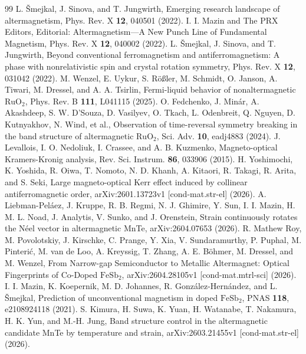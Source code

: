 \documentclass{article}
\begin{document}
\begin{thebibliography}{99}
 L. Šmejkal, J. Sinova, and T. Jungwirth, Emerging research landscape of altermagnetism, Phys. Rev. X \textbf{12}, 040501 (2022).
 I. I. Mazin and The PRX Editors, Editorial: Altermagnetism—A New Punch Line of Fundamental Magnetism, Phys. Rev. X \textbf{12}, 040002 (2022).
 L. Šmejkal, J. Sinova, and T. Jungwirth, Beyond conventional ferromagnetism and antiferromagnetism: A phase with nonrelativistic spin and crystal rotation symmetry, Phys. Rev. X \textbf{12}, 031042 (2022).
 M. Wenzel, E. Uykur, S. Rößler, M. Schmidt, O. Janson, A. Tiwari, M. Dressel, and A. A. Tsirlin, Fermi-liquid behavior of nonaltermagnetic \(\mathrm{RuO}_2\), Phys. Rev. B \textbf{111}, L041115 (2025).
 O. Fedchenko, J. Minár, A. Akashdeep, S. W. D'Souza, D. Vasilyev, O. Tkach, L. Odenbreit, Q. Nguyen, D. Kutnyakhov, N. Wind, et al., Observation of time-reversal symmetry breaking in the band structure of altermagnetic \(\mathrm{RuO}_2\), Sci. Adv. \textbf{10}, eadj4883 (2024).
 J. Levallois, I. O. Nedoliuk, I. Crassee, and A. B. Kuzmenko, Magneto-optical Kramers-Kronig analysis, Rev. Sci. Instrum. \textbf{86}, 033906 (2015).
 H. Yoshimochi, K. Yoshida, R. Oiwa, T. Nomoto, N. D. Khanh, A. Kitaori, R. Takagi, R. Arita, and S. Seki, Large magneto-optical Kerr effect induced by collinear antiferromagnetic order, arXiv:2601.13723v1 [cond-mat.str-el] (2026).
 A. Liebman-Peláez, J. Kruppe, R. B. Regmi, N. J. Ghimire, Y. Sun, I. I. Mazin, H. M. L. Noad, J. Analytis, V. Sunko, and J. Orenstein, Strain continuously rotates the Néel vector in altermagnetic MnTe, arXiv:2604.07653 (2026).
 R. Mathew Roy, M. Povolotskiy, J. Kirschke, C. Prange, Y. Xia, V. Sundaramurthy, P. Puphal, M. Pinterić, M. van de Loo, A. Kreyssig, T. Zhang, A. E. Böhmer, M. Dressel, and M. Wenzel, From Narrow-gap Semiconductor to Metallic Altermagnet: Optical Fingerprints of Co-Doped \(\mathrm{FeSb}_2\), arXiv:2604.28105v1 [cond-mat.mtrl-sci] (2026).
 I. I. Mazin, K. Koepernik, M. D. Johannes, R. González-Hernández, and L. Šmejkal, Prediction of unconventional magnetism in doped \(\mathrm{FeSb}_2\), PNAS \textbf{118}, e2108924118 (2021).
 S. Kimura, H. Suwa, K. Yuan, H. Watanabe, T. Nakamura, H. K. Yun, and M.-H. Jung, Band structure control in the altermagnetic candidate MnTe by temperature and strain, arXiv:2603.21455v1 [cond-mat.str-el] (2026).

\end{thebibliography}
\end{document}
